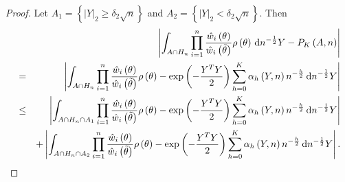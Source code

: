 \begin{proof}
Let $A_{1}=\left\{ \left|Y\right|_{2}\ge\delta_{2}\sqrt{n}\right\} $
and $A_{2}=\left\{ \left|Y\right|_{2}<\delta_{2}\sqrt{n}\right\} $.
Then 
\begin{eqnarray*}
 &  & \left|\int_{A\cap H_{n}}\prod_{i=1}^{n}\frac{\hat{w}_{i}\left(\theta\right)}{\hat{w}_{i}\left(\tilde{\theta}\right)}\rho\left(\theta\right)\,\mathrm{d} n^{-\frac{1}{2}}Y-P_{K}\left(A,n\right)\right|\\
 & = & \left|\int_{A\cap H_{n}}\prod_{i=1}^{n}\frac{\hat{w}_{i}\left(\theta\right)}{\hat{w}_{i}\left(\tilde{\theta}\right)}\rho\left(\theta\right)-\exp\left(-\frac{Y^{T}Y}{2}\right)\sum_{h=0}^{K}\alpha_{h}\left(Y,n\right)n^{-\frac{h}{2}}\,\mathrm{d} n^{-\frac{1}{2}}Y\right|\\
 & \le & \left|\int_{A\cap H_{n}\cap A_{1}}\prod_{i=1}^{n}\frac{\hat{w}_{i}\left(\theta\right)}{\hat{w}_{i}\left(\tilde{\theta}\right)}\rho\left(\theta\right)-\exp\left(-\frac{Y^{T}Y}{2}\right)\sum_{h=0}^{K}\alpha_{h}\left(Y,n\right)n^{-\frac{h}{2}}\,\mathrm{d} n^{-\frac{1}{2}}Y\right|\\
 &  & +\left|\int_{A\cap H_{n}\cap A_{2}}\prod_{i=1}^{n}\frac{\hat{w}_{i}\left(\theta\right)}{\hat{w}_{i}\left(\tilde{\theta}\right)}\rho\left(\theta\right)-\exp\left(-\frac{Y^{T}Y}{2}\right)\sum_{h=0}^{K}\alpha_{h}\left(Y,n\right)n^{-\frac{h}{2}}\,\mathrm{d} n^{-\frac{1}{2}}Y\right|.
\end{eqnarray*}



\end{proof}
